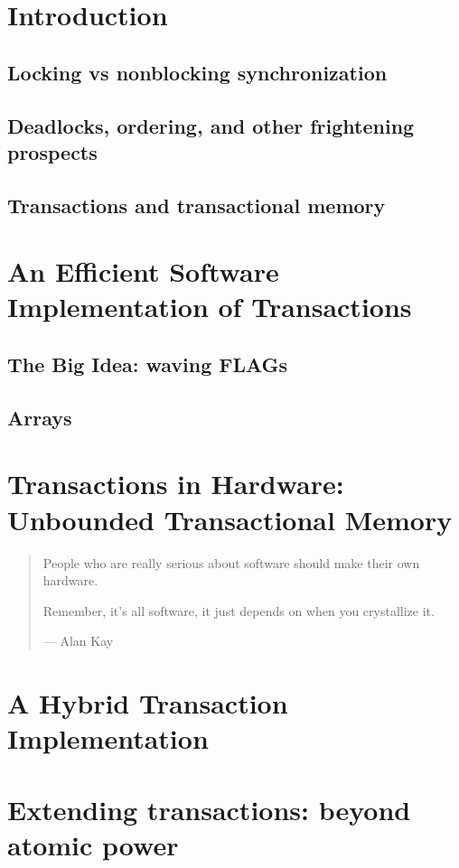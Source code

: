 \documentclass{phd-thesis}
\author{C. Scott Ananian}
\title{\subtitle}
\date{\subdate \\ $ $Revision: 1.2 $ $}
\begin{document}

\frontmatter


\mainmatter
\chapter{Introduction}
\section{Locking vs nonblocking synchronization}
\section{Deadlocks, ordering, and other frightening prospects}
\section{Transactions and transactional memory}

\chapter{An Efficient Software Implementation of Transactions}
\section{The Big Idea: waving FLAGs}
\section{Arrays}
\chapter{Transactions in Hardware: Unbounded Transactional Memory}
\begin{quote}
People who are really serious about software should make their own hardware.

Remember, it's all software, it just depends on when you crystallize
it. 

 --- Alan Kay

\end{quote}


\chapter{A Hybrid Transaction Implementation}

\chapter{Extending transactions: beyond atomic power}
\end{document}
